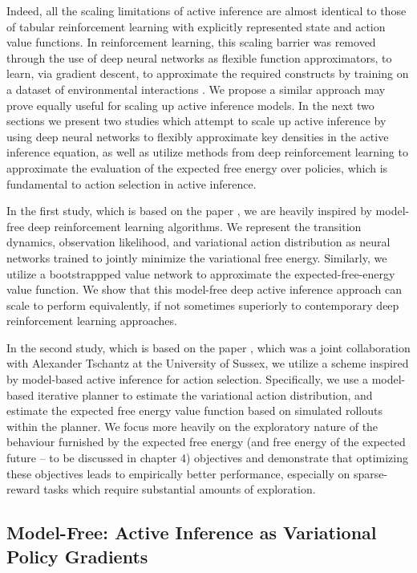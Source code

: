 Indeed, all the scaling limitations of active inference are almost identical to those of tabular reinforcement learning with explicitly represented state and action value functions. In reinforcement learning, this scaling barrier was removed through the use of deep neural networks as flexible function approximators, to learn, via gradient descent, to approximate the required constructs by training on a dataset of environmental interactions \citep{sutton2018reinforcement}. We propose a similar approach may prove equally useful for scaling up active inference models. In the next two sections we present two studies which attempt to scale up active inference by using deep neural networks to flexibly approximate key densities in the active inference equation, as well as utilize methods from deep reinforcement learning to approximate the evaluation of the expected free energy over policies, which is fundamental to action selection in active inference. 

In the first study, which is based on the paper \citep{millidge_deep_2019}, we are heavily inspired by model-free deep reinforcement learning algorithms. We represent the transition dynamics, observation likelihood, and variational action distribution as neural networks trained to jointly minimize the variational free energy. Similarly, we utilize a bootstrappped value network to approximate the expected-free-energy value function. We show that this model-free deep active inference approach can scale to perform equivalently, if not sometimes superiorly to contemporary deep reinforcement learning approaches.

In the second study, which is based on the paper \citep{tschantz2020reinforcement}, which was a joint collaboration with Alexander Tschantz at the University of Sussex, we utilize a scheme inspired by model-based active inference for action selection. Specifically, we use a model-based iterative planner to estimate the variational action distribution, and estimate the expected free energy value function based on simulated rollouts within the planner. We focus more heavily on the exploratory nature of the behaviour furnished by the expected free energy (and free energy of the expected future -- to be discussed in chapter 4) objectives and demonstrate that optimizing these objectives leads to empirically better performance, especially on sparse-reward tasks which require substantial amounts of exploration.


\subsection{Model-Free: Active Inference as Variational Policy Gradients}

